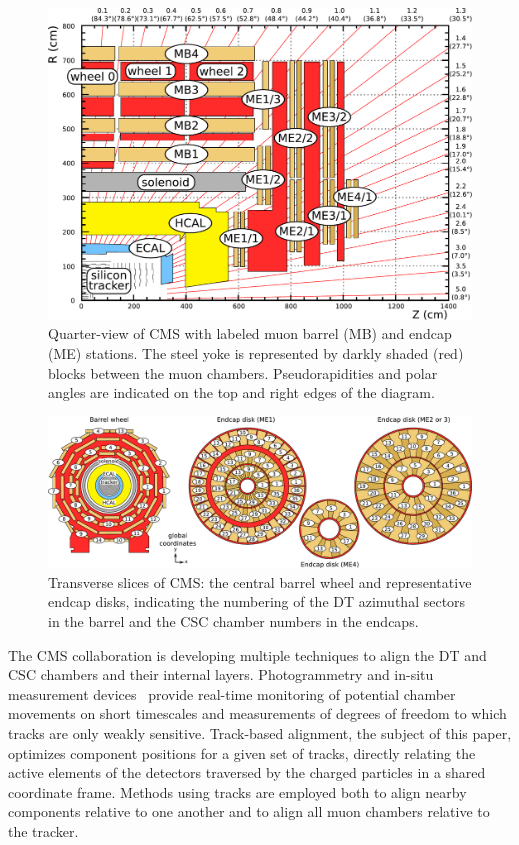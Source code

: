\begin{figure}[p]
\includegraphics[width=\linewidth]{plots/intro_geom/muon_system_labeled2.pdf}

\caption{Quarter-view of CMS with labeled muon barrel (MB) and endcap
(ME) stations.  The steel yoke is represented by darkly shaded (red) blocks
between the muon chambers.  Pseudorapidities and polar angles are
indicated on the top and right edges of the diagram. \label{fig:muon_system_labeled}}
\end{figure}

\begin{figure}[p]
\includegraphics[width=\linewidth]{plots/intro_geom/muoneverything.pdf}

\caption{Transverse slices of CMS: the central barrel wheel and
representative endcap disks, indicating the numbering of the DT azimuthal sectors in
the barrel and the CSC chamber numbers in the endcaps. \label{fig:muoneverything}}
\end{figure}

The CMS collaboration is developing multiple techniques to align the
DT and CSC chambers and their internal layers.  Photogrammetry and
in-situ measurement devices~\cite{ref:hardware_alignment} provide
real-time monitoring of potential chamber movements on short
timescales and measurements of degrees of freedom to which tracks are
only weakly sensitive.  Track-based alignment, the subject of this
paper, optimizes component positions for a given set of tracks,
directly relating the active elements of the detectors traversed by
the charged particles in a shared coordinate frame.  Methods using
tracks are employed both to align nearby components relative to one
another and to align all muon chambers relative to the tracker.

